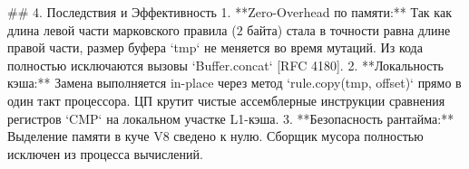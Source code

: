 ## 4. Последствия и Эффективность
1. **Zero-Overhead по памяти:** Так как длина левой части марковского правила ($2\text{ байта}$) стала в точности равна длине правой части, размер буфера `tmp` не меняется во время мутаций. Из кода полностью исключаются вызовы `Buffer.concat` [RFC 4180].
2. **Локальность кэша:** Замена выполняется in-place через метод `rule.copy(tmp, offset)` прямо в один такт процессора. ЦП крутит чистые ассемблерные инструкции сравнения регистров `CMP` на локальном участке L1-кэша.
3. **Безопасность рантайма:** Выделение памяти в куче V8 сведено к нулю. Сборщик мусора полностью исключен из процесса вычислений.
